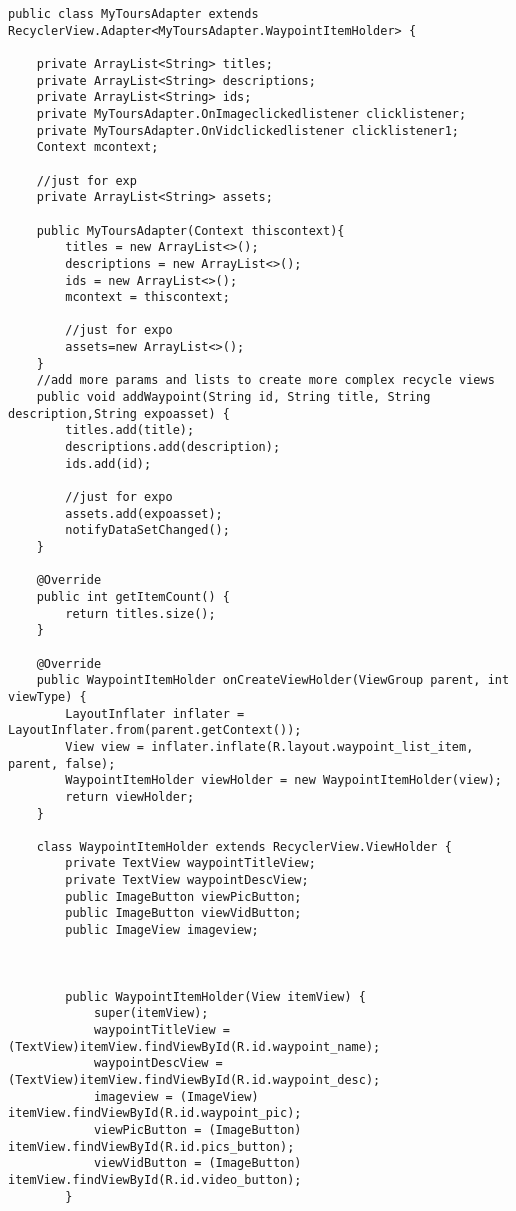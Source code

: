 \documentclass[letterpaper, 10pt,titlepage]{article}
\begin{document}
\begin{verbatim}
public class MyToursAdapter extends RecyclerView.Adapter<MyToursAdapter.WaypointItemHolder> {

    private ArrayList<String> titles;
    private ArrayList<String> descriptions;
    private ArrayList<String> ids;
    private MyToursAdapter.OnImageclickedlistener clicklistener;
    private MyToursAdapter.OnVidclickedlistener clicklistener1;
    Context mcontext;

    //just for exp
    private ArrayList<String> assets;

    public MyToursAdapter(Context thiscontext){
        titles = new ArrayList<>();
        descriptions = new ArrayList<>();
        ids = new ArrayList<>();
        mcontext = thiscontext;

        //just for expo
        assets=new ArrayList<>();
    }
    //add more params and lists to create more complex recycle views
    public void addWaypoint(String id, String title, String description,String expoasset) {
        titles.add(title);
        descriptions.add(description);
        ids.add(id);

        //just for expo
        assets.add(expoasset);
        notifyDataSetChanged();
    }

    @Override
    public int getItemCount() {
        return titles.size();
    }

    @Override
    public WaypointItemHolder onCreateViewHolder(ViewGroup parent, int viewType) {
        LayoutInflater inflater = LayoutInflater.from(parent.getContext());
        View view = inflater.inflate(R.layout.waypoint_list_item, parent, false);
        WaypointItemHolder viewHolder = new WaypointItemHolder(view);
        return viewHolder;
    }

    class WaypointItemHolder extends RecyclerView.ViewHolder {
        private TextView waypointTitleView;
        private TextView waypointDescView;
        public ImageButton viewPicButton;
        public ImageButton viewVidButton;
        public ImageView imageview;



        public WaypointItemHolder(View itemView) {
            super(itemView);
            waypointTitleView = (TextView)itemView.findViewById(R.id.waypoint_name);
            waypointDescView = (TextView)itemView.findViewById(R.id.waypoint_desc);
            imageview = (ImageView) itemView.findViewById(R.id.waypoint_pic);
            viewPicButton = (ImageButton) itemView.findViewById(R.id.pics_button);
            viewVidButton = (ImageButton) itemView.findViewById(R.id.video_button);
        }


\end{verbatim}
\end{document}

